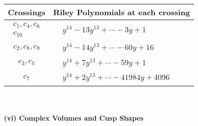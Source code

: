 \documentclass[1p]{elsarticle_modified}
\theoremstyle{definition}
\begin{document}
\begin{tabular}{m{50pt}|m{274pt}}
Crossings & \hspace{64pt}Riley Polynomials at each crossing \\
\hline $$\begin{aligned}c_{1},c_{4},c_{6}\\c_{10}\end{aligned}$$&$\begin{aligned}
&y^{14}-13 y^{13}+\cdots-3 y+1
\end{aligned}$\\
\hline $$\begin{aligned}c_{2},c_{8},c_{9}\end{aligned}$$&$\begin{aligned}
&y^{14}-14 y^{13}+\cdots-60 y+16
\end{aligned}$\\
\hline $$\begin{aligned}c_{3},c_{5}\end{aligned}$$&$\begin{aligned}
&y^{14}+7 y^{13}+\cdots-59 y+1
\end{aligned}$\\
\hline $$\begin{aligned}c_{7}\end{aligned}$$&$\begin{aligned}
&y^{14}+2 y^{13}+\cdots-41984 y+4096
\end{aligned}$\\
\hline
\end{tabular}\\~\\
\newpage\flushleft \textbf{(vi) Complex Volumes and Cusp Shapes}
\end{document}

